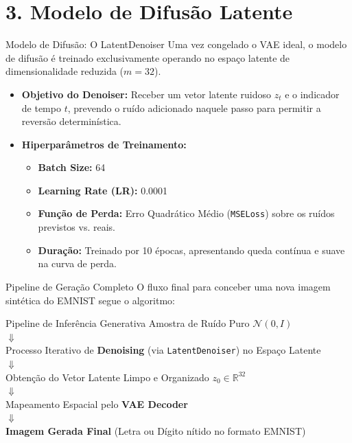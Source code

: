 \documentclass[10pt,aspectratio=169]{beamer}
\begin{document}
\section{3. Modelo de Difusão Latente}
\begin{frame}{Modelo de Difusão: O LatentDenoiser}
    Uma vez congelado o VAE ideal, o modelo de difusão é treinado exclusivamente operando no espaço latente de dimensionalidade reduzida ($m=32$).
    \vspace{0.2cm}
    \begin{itemize}
        \item \textbf{Objetivo do Denoiser:} Receber um vetor latente ruidoso $z_t$ e o indicador de tempo $t$, prevendo o ruído adicionado naquele passo para permitir a reversão determinística.
        \item \textbf{Hiperparâmetros de Treinamento:}
        \begin{itemize}
            \item \textbf{Batch Size:} 64
            \item \textbf{Learning Rate (LR):} 0.0001
            \item \textbf{Função de Perda:} Erro Quadrático Médio (\texttt{MSELoss}) sobre os ruídos previstos vs. reais.
            \item \textbf{Duração:} Treinado por 10 épocas, apresentando queda contínua e suave na curva de perda.
        \end{itemize}
    \end{itemize}
\end{frame}

\begin{frame}{Pipeline de Geração Completo}
    O fluxo final para conceber uma nova imagem sintética do EMNIST segue o algoritmo:
    \vspace{0.4cm}
    \begin{block}{Pipeline de Inferência Generativa}
        \centering
        Amostra de Ruído Puro $\mathcal{N}(0, I)$ \\
        $\Downarrow$ \\
        Processo Iterativo de \textbf{Denoising} (via \texttt{LatentDenoiser}) no Espaço Latente \\
        $\Downarrow$ \\
        Obtenção do Vetor Latente Limpo e Organizado $z_0 \in \mathbb{R}^{32}$ \\
        $\Downarrow$ \\
        Mapeamento Espacial pelo \textbf{VAE Decoder} \\
        $\Downarrow$ \\
        \textbf{Imagem Gerada Final} (Letra ou Dígito nítido no formato EMNIST)
    \end{block}
\end{frame}
\end{document}
